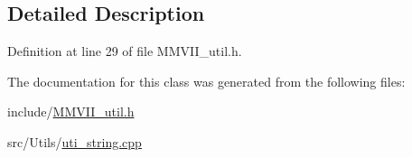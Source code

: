 \subsection{Detailed Description}


Definition at line 29 of file M\+M\+V\+I\+I\+\_\+util.\+h.



The documentation for this class was generated from the following files\+:\begin{DoxyCompactItemize}
\item 
include/\hyperlink{MMVII__util_8h}{M\+M\+V\+I\+I\+\_\+util.\+h}\item 
src/\+Utils/\hyperlink{uti__string_8cpp}{uti\+\_\+string.\+cpp}\end{DoxyCompactItemize}
